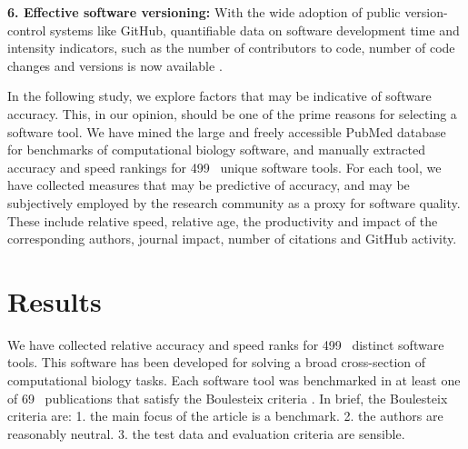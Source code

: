 \documentclass{bmcart}
\def\numTools{499}
\def\numBenchmarkPubs{69}
\begin{document}
{\color{red}\textbf{6. Effective software versioning:} With the wide adoption of
public version-control systems like GitHub, quantifiable data on
software development time and intensity indicators, such as the number
of contributors to code, number of code changes and versions is
now available \cite{ray2014large,Dozmorov:2018,Mangul:2019}.}

In the following study, we explore factors that may be indicative of
software accuracy. This, in our opinion, should be one of the prime
reasons for selecting a software tool. We have mined the large and
freely accessible PubMed database \cite{Sayers2010-vm} for benchmarks
of computational biology software, and manually extracted accuracy and
speed rankings for \numTools~ unique software tools. For
each tool, we have collected measures that may be predictive
of accuracy, and may be subjectively employed by the research
community as a proxy for software quality. These include relative
speed, relative age, the productivity and impact of the corresponding
authors, journal impact, number of citations {\color{red}and GitHub activity}.

\section*{Results}
We have collected relative accuracy and speed ranks for
\numTools~ distinct software tools. This software has
been developed for solving a broad cross-section of computational biology
tasks.
Each software tool was benchmarked in at least one of
\numBenchmarkPubs~ publications that satisfy the Boulesteix
criteria \cite{Boulesteix2013-vb}. In brief, the Boulesteix criteria
are: 1. the main focus of the article is a benchmark. 2. the authors
are reasonably neutral. 3. the test data and evaluation criteria are
sensible.
\end{document}
